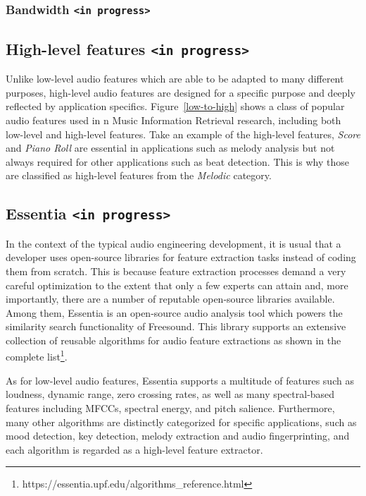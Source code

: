 \subsubsection{Bandwidth \texttt{<in progress>}}

\subsection{High-level features \texttt{<in progress>}}
Unlike low-level audio features which are able to be adapted to many different purposes, high-level audio features are designed for a specific purpose and deeply reflected by application specifics. Figure~\ref{low-to-high} shows a class of popular audio features used in n Music Information Retrieval research, including both low-level and high-level features. Take an example of the high-level features, \textit{Score} and \textit{Piano Roll} are essential in applications such as melody analysis but not always required for other applications such as beat detection. This is why those are classified as high-level features from the \textit{Melodic} category.

\subsection{Essentia \texttt{<in progress>}}
In the context of the typical audio engineering development, it is usual that a developer uses open-source libraries for feature extraction tasks instead of coding them from scratch. This is because feature extraction processes demand a very careful optimization to the extent that only a few experts can attain and, more importantly, there are a number of reputable open-source libraries available. Among them, Essentia is an open-source audio analysis tool which powers the similarity search functionality of Freesound. This library supports an extensive collection of reusable algorithms for audio feature extractions as shown in the complete list\footnote{https://essentia.upf.edu/algorithms\_reference.html}. 

As for low-level audio features, Essentia supports a multitude of features such as loudness, dynamic range, zero crossing rates, as well as many spectral-based features including MFCCs, spectral energy, and pitch salience. Furthermore, many other algorithms are distinctly categorized for specific applications, such as mood detection, key detection, melody extraction and audio fingerprinting, and each algorithm is regarded as a high-level feature extractor.


